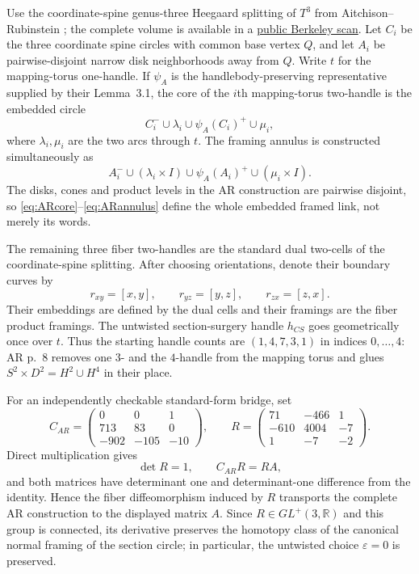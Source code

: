 \documentclass[11pt]{amsart}
\theoremstyle{definition}
\theoremstyle{remark}
\begin{document}
Use the coordinate-spine genus-three Heegaard splitting of $T^3$ from
Aitchison--Rubinstein \cite[pp.~5--12]{AitchisonRubinstein1984}; the complete
volume is available in a
\href{https://math.berkeley.edu/~kirby/papers/Gordon%20and%20Kirby%20%28editors%29%20-%20Four-manifold%20theory%20%28Durham%29%20-%20MR0780574.pdf}
{public Berkeley scan}.  Let
$C_i$ be the three coordinate spine circles with common base vertex $Q$, and
let $A_i$ be pairwise-disjoint narrow disk neighborhoods away from $Q$.
Write $t$ for the mapping-torus one-handle.  If $\psi_A$ is the
handlebody-preserving representative supplied by their Lemma~3.1, the core
of the $i$th mapping-torus two-handle is the embedded circle
\begin{equation}\label{eq:ARcore}
C_i^-\cup\lambda_i\cup\psi_A(C_i)^+\cup\mu_i,
\end{equation}
where $\lambda_i,\mu_i$ are the two arcs through $t$.  The framing annulus is
constructed simultaneously as
\begin{equation}\label{eq:ARannulus}
A_i^-\cup(\lambda_i\times I)\cup\psi_A(A_i)^+
       \cup(\mu_i\times I).
\end{equation}
The disks, cones and product levels in the AR construction are pairwise
disjoint, so \eqref{eq:ARcore}--\eqref{eq:ARannulus} define the whole
embedded framed link, not merely its words.

The remaining three fiber two-handles are the standard dual two-cells of the
coordinate-spine splitting.  After choosing orientations, denote their
boundary curves by
\[
r_{xy}=[x,y],\qquad r_{yz}=[y,z],\qquad r_{zx}=[z,x].
\]
Their embeddings are defined by the dual cells and their framings are the
fiber product framings.  The untwisted section-surgery handle $h_{CS}$ goes
geometrically once over $t$.  Thus the starting handle counts are
$(1,4,7,3,1)$ in indices $0,\ldots,4$: AR p.~8 removes one $3$- and the
$4$-handle from the mapping torus and glues
$S^2\times D^2=H^2\cup H^4$ in their place.

For an independently checkable standard-form bridge, set
\[
C_{AR}=\begin{pmatrix}0&0&1\\713&83&0\\-902&-105&-10\end{pmatrix},
\qquad
R=\begin{pmatrix}71&-466&1\\-610&4004&-7\\1&-7&-2\end{pmatrix}.
\]
Direct multiplication gives
\[
\det R=1,\qquad C_{AR}R=RA,
\]
and both matrices have determinant one and determinant-one difference from
the identity.  Hence the fiber diffeomorphism induced by $R$ transports the
complete AR construction to the displayed matrix $A$.  Since
$R\in GL^+(3,\mathbb R)$ and this group is connected, its derivative preserves
the homotopy class of the canonical normal framing of the section circle; in
particular, the untwisted choice $\varepsilon=0$ is preserved.
\end{document}
